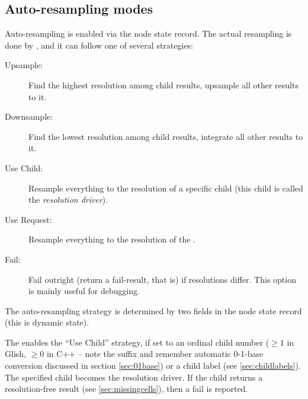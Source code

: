 \subsection{Auto-resampling modes}

  Auto-resampling is enabled via the node state record. The actual resampling
  is done by , and it can follow one of several 
  strategies:
  
  \begin{description}
  
  \item[Upsample:] Find the highest resolution among child results, upsample all other
    results to it.

  \item[Downsample:] Find the lowest resolution among child results,  integrate all other
    results to it.
    
  \item[Use Child:] Resample everything to the resolution of a specific child
    (this child is called the {\em resolution driver}\/).

  \item[Use Request:] Resample everything to the resolution of the \Request.

  \item[Fail:] Fail outright (return a fail-result, that is) if resolutions differ.
    This option is mainly useful for debugging.

  \end{description}
  
  The auto-resampling strategy is determined by two fields in the node state
  record (this is dynamic state).
  
  The  enables the ``Use Child'' strategy, if set
  to an ordinal child number ($\ge 1$ in Glish, $\ge 0$ in C++ -- note the  suffix and remember automatic
  0-1-base conversion discussed in section \ref{sec:01base}) or a child label
  (see \ref{sec:childlabels}). The specified child becomes the resolution
  driver. If the child returns a resolution-free result (see
  \ref{sec:missingcells}), then a fail is reported.
  

